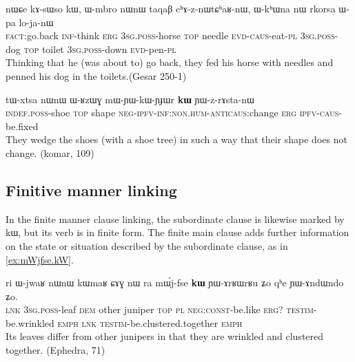 \documentclass[oldfontcommands,oneside,a4paper,11pt]{article}
\newcommand{\ipa}[1]{{\phon #1}} %
\begin{document}
  \begin{exe}
\ex \label{ex:nWCe.kAsWso}
\gll 
\ipa{nɯɕe}  	\ipa{kɤ-sɯso}  	\ipa{kɯ,}  	\ipa{ɯ-mbro}  	\ipa{nɯnɯ}  	\ipa{taqaβ}  	\ipa{cʰɤ-z-nɯtɕʰaʁ-nɯ,}  	\ipa{ɯ-kʰɯna}  	\ipa{nɯ}  	\ipa{rkorsa}  	\ipa{ɯ-pa}  	\ipa{lo-ja-nɯ}  \\
\textsc{fact}:go.back \textsc{inf}-think \textsc{erg} \textsc{3sg.poss}-horse \textsc{top} needle \textsc{evd-caus}-eat-\textsc{pl}   \textsc{3sg.poss}-dog \textsc{top} toilet \textsc{3sg.poss}-down \textsc{evd}-pen-\textsc{pl} \\
\glt Thinking that he (was about to) go back, they fed his horse with needles and penned his dog in the toilets.(Gesar 250-1)
 \end{exe} 
 
 

\begin{exe}
\ex \label{ex:mWYWkWYJWr}
\gll
\ipa{tɯ-xtsa}   	\ipa{nɯnɯ}   	\ipa{ɯ-ʁzɯɣ}   	\ipa{mɯ-ɲɯ-kɯ-ɲɟɯr}   	\ipa{\textbf{kɯ}}   	\ipa{ɲɯ-z-rɤsta-nɯ}   \\
\textsc{indef.poss}-shoe \textsc{top} shape \textsc{neg-ipfv-inf:non.hum-anticaus}:change \textsc{erg} \textsc{ipfv-caus}-be.fixed \\
\glt They wedge the shoes (with a shoe tree)  in such a way that their shape does not change. (komar, 109)
\end{exe}

\subsection{Finitive manner linking}
In the finite manner clause linking, the subordinate clause is likewise marked by \ipa{kɯ}, but its verb is in finite form. The  finite  main clause adds further information on the state or situation described by the subordinate clause, as in \ref{ex:mWjfse.kW}. 
 

 \begin{exe}
\ex \label{ex:mWjfse.kW}
\gll
\ipa{ri} 	\ipa{ɯ-jwaʁ} 	\ipa{nɯnɯ} 	\ipa{kɯmaʁ} 	\ipa{ɕɤɣ} 	\ipa{nɯ} \ipa{ra} 	\ipa{mɯ́j-fse} 	\ipa{\textbf{kɯ}} 	\ipa{ɲɯ-ɤrʁɯrʁu} 	\ipa{ʑo} 	\ipa{qʰe} 	\ipa{ɲɯ-ɤndɯndo} 	\ipa{ʑo.} \\
\textsc{lnk} \textsc{3sg.poss}-leaf \textsc{dem} other juniper \textsc{top} \textsc{pl} \textsc{neg:const}-be.like \textsc{erg?} \textsc{testim}-be.wrinkled \textsc{emph} \textsc{lnk}  \textsc{testim}-be.clustered.together \textsc{emph} \\
\glt Its leaves differ from other junipers in that they are wrinkled and clustered together. (Ephedra, 71)
 \end{exe}
 
\end{document}
